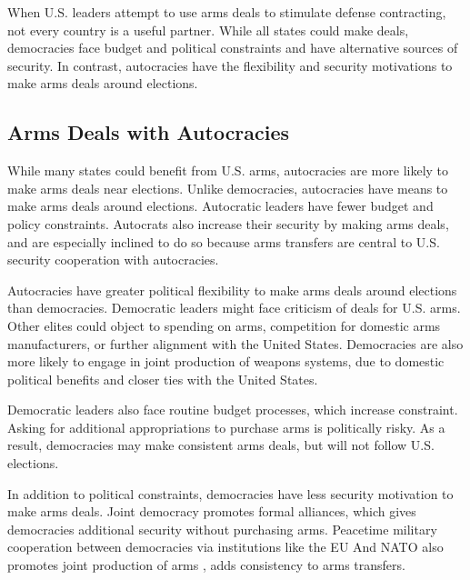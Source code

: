 \documentclass[12pt]{article}
\begin{document}
When U.S. leaders attempt to use arms deals to stimulate defense contracting, not every country is a useful partner. 
While all states could make deals, democracies face budget and political constraints and have alternative sources of security.
In contrast, autocracies have the flexibility and security motivations to make arms deals around elections.



\subsection{Arms Deals with Autocracies}


While many states could benefit from U.S. arms, autocracies are more likely to make arms deals near elections. 
Unlike democracies, autocracies have means to make arms deals around elections.
Autocratic leaders have fewer budget and policy constraints. 
Autocrats also increase their security by making arms deals, and are especially inclined to do so because arms transfers are central to U.S. security cooperation with autocracies.


Autocracies have greater political flexibility to make arms deals around elections than democracies. 
Democratic leaders might face criticism of deals for U.S. arms.
Other elites could object to spending on arms, competition for domestic arms manufacturers, or further alignment with the United States.
Democracies are also more likely to engage in joint production of weapons systems, due to domestic political benefits and closer ties with the United States.


Democratic leaders also face routine budget processes, which increase constraint.
Asking for additional appropriations to purchase arms is politically risky. 
As a result, democracies may make consistent arms deals, but will not follow U.S. elections.


In addition to political constraints, democracies have less security motivation to make arms deals. 
Joint democracy promotes formal alliances, which gives democracies additional security without purchasing arms. 
Peacetime military cooperation between democracies via institutions like the EU And NATO also promotes joint production of arms \citep{Klare1983, Bitzinger1994}, adds consistency to arms transfers. 
\end{document}
